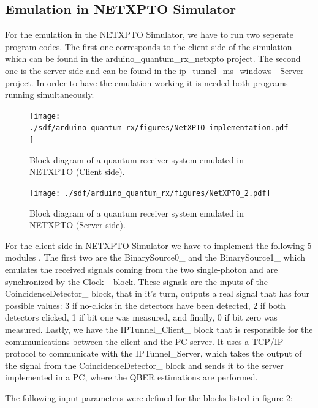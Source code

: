 \begin{refsection}
\begin{figure}[H]
	\end{figure}


		
	\subsection{Emulation in NETXPTO Simulator}
	
	For the emulation in the NETXPTO Simulator, we have to run two seperate program codes. The first one corresponds to the client side of the simulation which can be found in the arduino\_quantum\_rx\_netxpto project. The second one is the server side and can be found in the ip\_tunnel\_ms\_windows - Server project. In order to have the emulation working it is needed both programs running simultaneously.
	
	
	
	\begin{figure}[H]
		\centering
		\texttt{[image: ./sdf/arduino\_quantum\_rx/figures/NetXPTO\_implementation.pdf]}
		\caption{Block diagram of a quantum receiver system emulated in NETXPTO (Client side).}
		
		\label{fig:netxpto}
	\end{figure}

	\begin{figure}[H]
		\centering
		\texttt{[image: ./sdf/arduino\_quantum\_rx/figures/NetXPTO\_2.pdf]}
		\caption{Block diagram of a quantum receiver system emulated in NETXPTO (Server side).}
		\label{fig:netxpto}
	\end{figure}
	
	For the client side in NETXPTO Simulator we have to implement the following 5 modules . The first two are the BinarySource0\_ and the BinarySource1\_ which emulates the received signals coming from the two single-photon and are synchronized by the Clock\_ block. These signals are the inputs of the CoincidenceDetector\_ block, that in it's turn, outputs a real signal that has four possible values: 3 if no-clicks in the detectors have been detected, 2 if both detectors clicked, 1 if bit one was measured, and finally, 0 if bit zero was measured. Lastly, we have the IPTunnel\_Client\_ block that is responsible for the comumunications between the client and the PC server. It uses a TCP/IP protocol to communicate with the IPTunnel\_Server, which takes the output of the signal from the CoincidenceDetector\_ block and sends it to the server implemented in a PC, where the QBER estimations are performed. 

	The following input parameters were defined for the blocks listed in figure \ref{fig:netxpto}: 
	

\end{refsection}

